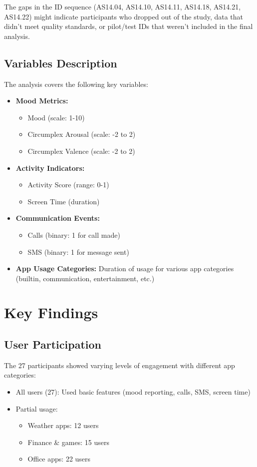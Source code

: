 \documentclass[11pt,a4paper]{article}
\begin{document}
The gaps in the ID sequence (AS14.04, AS14.10, AS14.11, AS14.18, AS14.21, AS14.22) might indicate participants who dropped out of the study, data that didn't meet quality standards, or pilot/test IDs that weren't included in the final analysis.

\subsection{Variables Description}
The analysis covers the following key variables:
\begin{itemize}
    \item \textbf{Mood Metrics:}
        \begin{itemize}
            \item Mood (scale: 1-10)
            \item Circumplex Arousal (scale: -2 to 2)
            \item Circumplex Valence (scale: -2 to 2)
        \end{itemize}
    \item \textbf{Activity Indicators:}
        \begin{itemize}
            \item Activity Score (range: 0-1)
            \item Screen Time (duration)
        \end{itemize}
    \item \textbf{Communication Events:}
        \begin{itemize}
            \item Calls (binary: 1 for call made)
            \item SMS (binary: 1 for message sent)
        \end{itemize}
    \item \textbf{App Usage Categories:} Duration of usage for various app categories (builtin, communication, entertainment, etc.)
\end{itemize}

\section{Key Findings}

\subsection{User Participation}
The 27 participants showed varying levels of engagement with different app categories:
\begin{itemize}
    \item All users (27): Used basic features (mood reporting, calls, SMS, screen time)
    \item Partial usage:
        \begin{itemize}
            \item Weather apps: 12 users
            \item Finance \& games: 15 users
            \item Office apps: 22 users
        \end{itemize}
\end{itemize}
\end{document}
